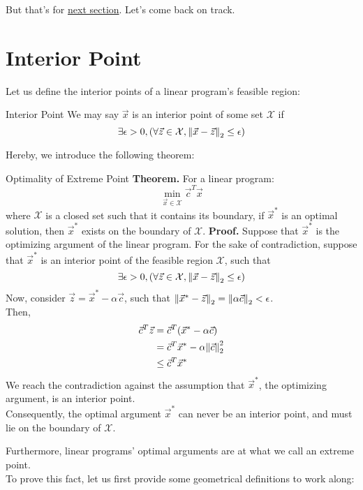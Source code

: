But that's for \href{https://www.youtube.com/watch?v=dQw4w9WgXcQ}{next section}. Let's come back on track.

\section{Interior Point}
Let us define the interior points of a linear program's feasible region:
\begin{ln-define}{Interior Point}{}
    We may say $\vec{x}$ is an interior point of some set $\mathcal{X}$ if
    \[
        \exists \epsilon > 0, (\forall \vec{z} \in \mathcal{X}, \pnorm{\vec{x} - \vec{z}}{2} \leq \epsilon)
    \]
\end{ln-define}
Hereby, we introduce the following theorem:
\begin{ln-theorem}{Optimality of Extreme Point}{}
    \textbf{Theorem.} For a linear program:
    \[
        \min_{\vec{x} \in \mathcal{X}} \vec{c}^T \vec{x}
    \]
    where $\mathcal{X}$ is a closed set such that it contains its boundary, if $\vec{x}^*$ is an optimal solution, then $\vec{x}^*$ exists on the boundary of $\mathcal{X}$.
    \tcblower
    \textbf{Proof.} Suppose that $\vec{x}^*$ is the optimizing argument of the linear program.
    For the sake of contradiction, suppose that $\vec{x}^*$ is an interior point of the feasible region $\mathcal{X}$, such that
    \[
        \exists \epsilon > 0, (\forall \vec{z} \in \mathcal{X}, \pnorm{\vec{x} - \vec{z}}{2} \leq \epsilon)
    \]
    Now, consider $\vec{z} = \vec{x}^* - \alpha \vec{c}$, such that $\pnorm{\vec{x}^* - \vec{z}}{2} = \pnorm{\alpha \vec{c}}{2} < \epsilon$. \\
    Then,
    \begin{align*}
        \vec{c}^T \vec{z}
        &= \vec{c}^T (\vec{x}^* - \alpha \vec{c}) \\
        &= \vec{c}^T \vec{x}^* - \alpha \pnorm[2]{\vec{c}}{2} \\
        &\leq \vec{c}^T \vec{x}^*
    \end{align*}
    We reach the contradiction against the assumption that $\vec{x}^*$, the optimizing argument, is an interior point. \\
    Consequently, the optimal argument $\vec{x}^*$ can never be an interior point, and must lie on the boundary of $\mathcal{X}$.
\end{ln-theorem}
Furthermore, linear programs' optimal arguments are at what we call an extreme point. \\
To prove this fact, let us first provide some geometrical definitions to work along:
